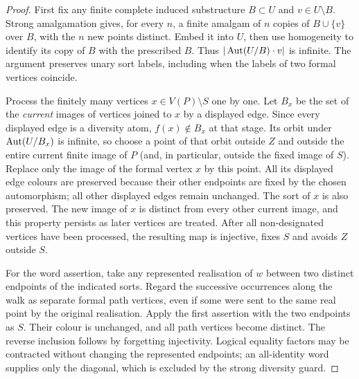 \begin{proof}
First fix any finite complete induced substructure $B\subset U$ and
$v\in U\setminus B$.  Strong amalgamation gives, for every $n$, a
finite amalgam of $n$ copies of $B\cup\{v\}$ over $B$, with the $n$
new points distinct.  Embed it into $U$, then use homogeneity to
identify its copy of $B$ with the prescribed $B$.  Thus
$|\operatorname{Aut}(U/B)\cdot v|$ is infinite.  The argument preserves unary sort
labels, including when the labels of two formal vertices coincide.

Process the finitely many vertices $x\in V(P)\setminus S$ one by one.
Let $B_x$ be the set of the \emph{current} images of vertices joined
to $x$ by a displayed edge.  Since every displayed edge is a
diversity atom, $f(x)\notin B_x$ at that stage.  Its orbit under
$\operatorname{Aut}(U/B_x)$ is infinite, so choose a point of that orbit outside
$Z$ and outside the entire current finite image of $P$ (and, in
particular, outside the fixed image of $S$).  Replace only the image
of the formal vertex $x$ by this point.  All its displayed edge
colours are preserved because their other endpoints are fixed by
the chosen automorphism; all other displayed edges remain unchanged.
The sort of $x$ is also preserved.  The new image of $x$ is distinct
from every other current image, and this property persists as later
vertices are treated.  After all non-designated vertices have been
processed, the resulting map is injective, fixes $S$ and avoids $Z$
outside $S$.

For the word assertion, take any represented realisation of $w$
between two distinct endpoints of the indicated sorts.  Regard the
successive occurrences along the walk as separate formal path
vertices, even if some were sent to the same real point by the
original realisation.  Apply the first assertion with the two
endpoints as $S$.  Their colour is unchanged, and all path vertices
become distinct.  The reverse inclusion follows by forgetting
injectivity.  Logical equality factors may be contracted without
changing the represented endpoints; an all-identity word supplies
only the diagonal, which is excluded by the strong diversity guard.
\end{proof}

